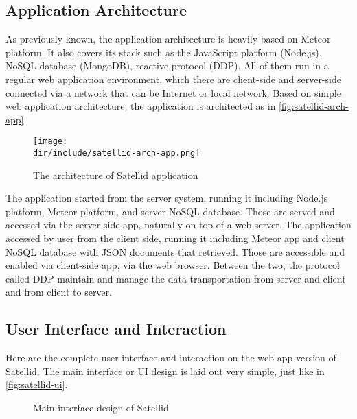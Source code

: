 \subsection{Application Architecture}

As previously known, the application architecture is heavily based on Meteor platform.
It also covers its stack such as the JavaScript platform (Node.js), NoSQL database (MongoDB), reactive protocol (DDP).
All of them run in a regular web application environment, which there are client-side and server-side connected via a network that can be Internet or local network.
Based on simple web application architecture, the application is architected as in \autoref{fig:satellid-arch-app}.

\begin{figure}[htbp]
    \centering
    \texttt{[image: \\dir/include/satellid-arch-app.png]}
    \caption[Satellid Application Architecture]{The architecture of Satellid application}
    \label{fig:satellid-arch-app}
\end{figure}

The application started from the server system, running it including Node.js platform, Meteor platform, and server NoSQL database.
Those are served and accessed via the server-side app, naturally on top of a web server.
The application accessed by user from the client side, running it including Meteor app and client NoSQL database with \ac{JSON} documents that retrieved.
Those are accessible and enabled via client-side app, via the web browser.
Between the two, the protocol called \ac{DDP} maintain and manage the data transportation from server and client and from client to server.

\subsection{User Interface and Interaction}

Here are the complete user interface and interaction on the web app version of Satellid.
The main interface or \ac{UI} design is laid out very simple, just like in \autoref{fig:satellid-ui}.

\begin{figure}[htb]
    \centering
    \caption{Main interface design of Satellid}
    \label{fig:satellid-ui}
\end{figure}

